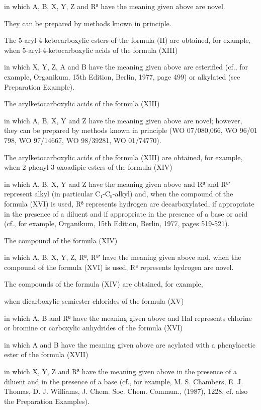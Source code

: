\documentclass[11pt,a4paper]{article}
\begin{document}
in which A, B, X, Y, Z and R⁸ have the meaning given above are novel.

They can be prepared by methods known in principle.

The 5-aryl-4-ketocarboxylic esters of the formula (II) are obtained, for example, when 5-aryl-4-ketocarboxylic acids of the formula (XIII)

in which X, Y, Z, A and B have the meaning given above are esterified (cf., for example, Organikum, 15th Edition, Berlin, 1977, page 499) or alkylated (see Preparation Example).

The arylketocarboxylic acids of the formula (XIII)

in which A, B, X, Y and Z have the meaning given above are novel; however, they can be prepared by methods known in principle (WO 07/080,066, WO 96/01 798, WO 97/14667, WO 98/39281, WO 01/74770).

The arylketocarboxylic acids of the formula (XIII) are obtained, for example, when 2-phenyl-3-oxoadipic esters of the formula (XIV)

in which A, B, X, Y and Z have the meaning given above and R⁸ and R⁸′ represent alkyl (in particular C₁-C₈-alkyl) and, when the compound of the formula (XVI) is used, R⁸ represents hydrogen are decarboxylated, if appropriate in the presence of a diluent and if appropriate in the presence of a base or acid (cf., for example, Organikum, 15th Edition, Berlin, 1977, pages 519-521).

The compound of the formula (XIV)

in which A, B, X, Y, Z, R⁸, R⁸′ have the meaning given above and, when the compound of the formula (XVI) is used, R⁸ represents hydrogen are novel.

The compounds of the formula (XIV) are obtained, for example,

when dicarboxylic semiester chlorides of the formula (XV)

in which A, B and R⁸ have the meaning given above and Hal represents chlorine or bromine or carboxylic anhydrides of the formula (XVI)

in which A and B have the meaning given above are acylated with a phenylacetic ester of the formula (XVII)

in which X, Y, Z and R⁸ have the meaning given above in the presence of a diluent and in the presence of a base (cf., for example, M. S. Chambers, E. J. Thomas, D. J. Williams, J. Chem. Soc. Chem. Commun., (1987), 1228, cf. also the Preparation Examples).
\end{document}
